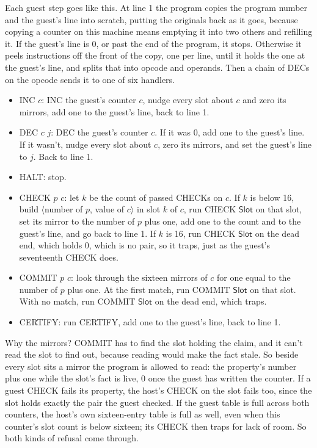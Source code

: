 \documentclass[11pt,twoside]{article}
\theoremstyle{thielethm}
\theoremstyle{thieledef}
\theoremstyle{thieledef}
\theoremstyle{thieledef}
\theoremstyle{thielethm}
\theoremstyle{thieleobs}
\theoremstyle{thielethm}
\begin{document}
Each guest step goes like this. At line 1 the program copies the program number and the guest's
line into scratch, putting the originals back as it goes, because copying a counter on this
machine means emptying it into two others and refilling it. If the guest's line is 0, or past
the end of the program, it stops. Otherwise it peels instructions off the front of the copy, one
per line, until it holds the one at the guest's line, and splits that into opcode and operands.
Then a chain of DECs on the opcode sends it to one of six handlers.

\begin{itemize}
\item INC $c$: INC the guest's counter $c$, nudge every slot about $c$ and zero its mirrors, add
one to the guest's line, back to line 1.
\item DEC $c$ $j$: DEC the guest's counter $c$. If it was 0, add one to the guest's line. If it
wasn't, nudge every slot about $c$, zero its mirrors, and set the guest's line to $j$. Back to
line 1.
\item HALT: stop.
\item CHECK $p$ $c$: let $k$ be the count of passed CHECKs on $c$. If $k$ is below 16, build
$\langle$number of $p$, value of $c\rangle$ in slot $k$ of $c$, run CHECK $\mathsf{Slot}$ on that
slot, set its mirror to the number of $p$ plus one, add one to the count and to the guest's line,
and go back to line 1. If $k$ is 16, run CHECK $\mathsf{Slot}$ on the dead end, which holds 0,
which is no pair, so it traps, just as the guest's seventeenth CHECK does.
\item COMMIT $p$ $c$: look through the sixteen mirrors of $c$ for one equal to the number of $p$
plus one. At the first match, run COMMIT $\mathsf{Slot}$ on that slot. With no match, run COMMIT
$\mathsf{Slot}$ on the dead end, which traps.
\item CERTIFY: run CERTIFY, add one to the guest's line, back to line 1.
\end{itemize}

Why the mirrors? COMMIT has to find the slot holding the claim, and it can't read the slot to
find out, because reading would make the fact stale. So beside every slot sits a mirror the
program is allowed to read: the property's number plus one while the slot's fact is live, 0 once
the guest has written the counter. If a guest CHECK fails its property, the host's CHECK on the slot fails too,
since the slot holds exactly the pair the guest checked. If the guest table is
full across both counters, the host's own sixteen-entry table is full as well,
even when this counter's slot count is below sixteen; its CHECK then traps for
lack of room. So both kinds of refusal come through.
\end{document}
